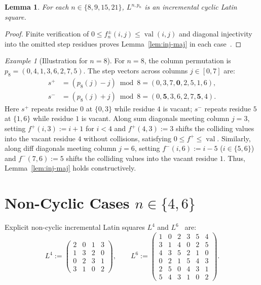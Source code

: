 \documentclass[10pt,a4paper]{article}
\newtheorem{lemma}[theorem]{Lemma}
\theoremstyle{remark}
\newtheorem{example}[theorem]{Example}
\newcommand{\val}{\operatorname{val}}
\begin{document}
\begin{lemma}\label{lem:small}
For each $n \in \{8, 9, 15, 21\}$, $L^{n,p_n}$ is an incremental cyclic Latin square.
\end{lemma}

\begin{proof}
Finite verification of $0 \le f^\pm_n(i,j) \le \val(i,j)$ and diagonal injectivity into the omitted
step residues proves Lemma~\ref{lem:inj-maj} in each case~\cite{PalomarLean,CompanionRepo}.
\end{proof}

\begin{example}[Illustration for $n = 8$]\label{ex:n8}
For $n = 8$, the column permutation is
$p_8 = (0, 4, 1, 3, 6, 2, 7, 5)$.
The step vectors across columns $j \in [0,7]$ are:
\begin{align*}
  s^+ &= (p_8(j) - j) \bmod 8 = (0, 3, 7, \mathbf{0}, 2, 5, 1, 6), \\
  s^- &= (p_8(j) + j) \bmod 8 = (0, \mathbf{5}, 3, 6, 2, 7, \mathbf{5}, 4).
\end{align*}
Here $s^+$ repeats residue $0$ at $\{0,3\}$ while residue $4$ is vacant; $s^-$ repeats residue $5$ at $\{1,6\}$ while residue $1$ is vacant.
Along sum diagonals meeting column $j = 3$, setting $f^+(i,3) := i + 1$ for $i < 4$ and $f^+(4,3) := 3$
shifts the colliding values into the vacant residue $4$ without collisions, satisfying $0 \le f^+ \le \val$.
Similarly, along diff diagonals meeting column $j = 6$, setting $f^-(i,6) := i - 5$ ($i \in \{5,6\}$) and
$f^-(7,6) := 5$ shifts the colliding values into the vacant residue $1$.
Thus, Lemma~\ref{lem:inj-maj} holds constructively.
\end{example}

\section[Non-Cyclic Cases]{Non-Cyclic Cases $n \in \{4, 6\}$}\label{app:noncyclic}

Explicit non-cyclic incremental Latin squares $L^4$ and $L^6$~\cite{PalomarLean,CompanionRepo} are:
\[
    L^4 :=
    \begin{pmatrix}
        2 & 0 & 1 & 3 \\
        1 & 3 & 2 & 0 \\
        0 & 2 & 3 & 1 \\
        3 & 1 & 0 & 2
    \end{pmatrix},
    \qquad
    L^6 :=
    \begin{pmatrix}
        1 & 0 & 2 & 3 & 5 & 4 \\
        3 & 1 & 4 & 0 & 2 & 5 \\
        4 & 3 & 5 & 2 & 1 & 0 \\
        0 & 2 & 1 & 5 & 4 & 3 \\
        2 & 5 & 0 & 4 & 3 & 1 \\
        5 & 4 & 3 & 1 & 0 & 2
    \end{pmatrix}.
\]
\end{document}
